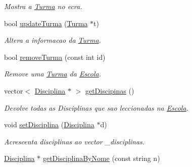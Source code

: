 \begin{DoxyCompactItemize}
\begin{DoxyCompactList}\small\item\em Mostra a \hyperlink{class_turma}{Turma} no ecra. \end{DoxyCompactList}\item 
\hypertarget{class_escola_a50eb8daf94842be3184daa133140157d}{bool \hyperlink{class_escola_a50eb8daf94842be3184daa133140157d}{update\-Turma} (\hyperlink{class_turma}{Turma} $\ast$t)}\label{class_escola_a50eb8daf94842be3184daa133140157d}

\begin{DoxyCompactList}\small\item\em Altera a informacao da \hyperlink{class_turma}{Turma}. \end{DoxyCompactList}\item 
\hypertarget{class_escola_a4011a23d4f49827e7cc74ea5739e9033}{bool \hyperlink{class_escola_a4011a23d4f49827e7cc74ea5739e9033}{remove\-Turma} (const int id)}\label{class_escola_a4011a23d4f49827e7cc74ea5739e9033}

\begin{DoxyCompactList}\small\item\em Remove uma \hyperlink{class_turma}{Turma} da \hyperlink{class_escola}{Escola}. \end{DoxyCompactList}\item 
\hypertarget{class_escola_a733893af8f3535eebe4624525945589d}{vector$<$ \hyperlink{class_disciplina}{Disciplina} $\ast$ $>$ \hyperlink{class_escola_a733893af8f3535eebe4624525945589d}{get\-Discipinas} ()}\label{class_escola_a733893af8f3535eebe4624525945589d}

\begin{DoxyCompactList}\small\item\em Devolve todas as Disciplinas que sao leccionadas na \hyperlink{class_escola}{Escola}. \end{DoxyCompactList}\item 
\hypertarget{class_escola_ac117e7e2d2f9c2ef22b41b6dc7a96708}{void \hyperlink{class_escola_ac117e7e2d2f9c2ef22b41b6dc7a96708}{set\-Disciplina} (\hyperlink{class_disciplina}{Disciplina} $\ast$d)}\label{class_escola_ac117e7e2d2f9c2ef22b41b6dc7a96708}

\begin{DoxyCompactList}\small\item\em Acrescenta disciplinas ao vector \-\_\-disciplinas. \end{DoxyCompactList}\item 
\hypertarget{class_escola_a75b1f1a614ca1163cf2c53f25331b939}{\hyperlink{class_disciplina}{Disciplina} $\ast$ \hyperlink{class_escola_a75b1f1a614ca1163cf2c53f25331b939}{get\-Disciplina\-By\-Nome} (const string n)}\label{class_escola_a75b1f1a614ca1163cf2c53f25331b939}


\end{DoxyCompactItemize}
